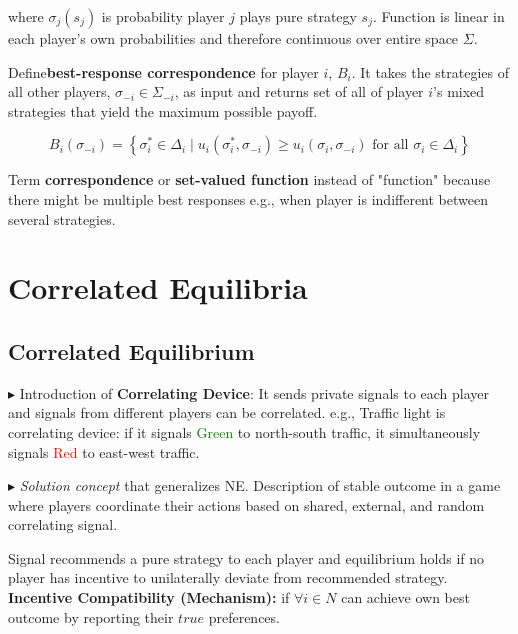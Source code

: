 \documentclass[../Main.tex]{subfiles}
\begin{document}
\begin{enumerate}
where $\sigma_j(s_j)$ is probability player $j$ plays pure strategy $s_j$. Function is linear in each player's own probabilities and therefore continuous over entire space $\Sigma$.

Define\textbf{best-response correspondence} for player $i$, $B_i$. It takes the strategies of all other players, $\sigma_{-i} \in \Sigma_{-i}$, as input and returns set of all of player $i$'s mixed strategies that yield the maximum possible payoff.

\begin{equation}
B_i(\sigma_{-i}) = \left\{ \sigma_i^* \in \Delta_i \mid u_i(\sigma_i^*, \sigma_{-i}) \ge u_i(\sigma_i, \sigma_{-i}) \text{ for all } \sigma_i \in \Delta_i \right\}
\end{equation}

Term \textbf{correspondence} or \textbf{set-valued function} instead of "function" because there might be multiple best responses e.g., when player is indifferent between several strategies.

\end{enumerate}

\section{Correlated Equilibria}
\subsection{Correlated Equilibrium}
$\blacktriangleright$ Introduction of \textbf{Correlating Device}: It sends private signals to each player and signals from different players can be correlated. e.g., Traffic light is correlating device: if it signals \textcolor{green}{Green} to north-south traffic, it simultaneously signals \textcolor{red}{Red} to east-west traffic. 

$\blacktriangleright$ \textit{Solution concept} that generalizes NE. Description of stable outcome in a game where players coordinate their actions based on shared, external, and random correlating signal.

Signal recommends a pure strategy to each player and equilibrium holds if no player has incentive to unilaterally deviate from recommended strategy.\\

\textbf{Incentive Compatibility (Mechanism):} if $\forall i \in N$ can achieve own best outcome by reporting their $true$ preferences. 
\end{document}
